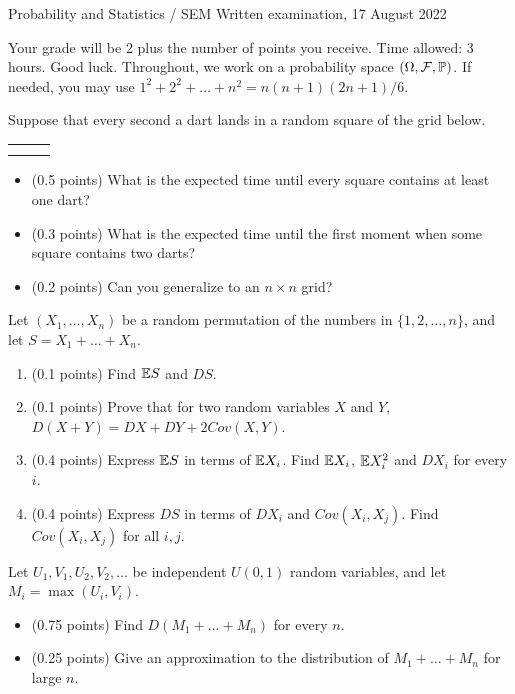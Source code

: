\documentclass[a4paper]{report}
\begin{document}
\noindent Probability and Statistics / SEM \hfill Written examination, 17 August 2022
\hrulefill
\begin{it}
Your grade will be 2 plus the number of points you receive. Time allowed: 3 hours. Good luck.
Throughout, we work on a probability space $(\Omega,{\mathcal{F}},\mathbb P)$.
If needed, you may use $1^2+2^2+\dots+n^2=n(n+1)(2n+1)/6$.
\end{it}
\begin{problem}
Suppose that every second a dart lands in a random square of the grid below.
\begingroup
\begin{center}
\setlength{\tabcolsep}{1pt}
\renewcommand{\arraystretch}{3}
\begin{tabular}{|*{3}{>{\collectcell\fwcell}c<{\endcollectcell}|}}
\hline & & \\ \hline & & \\ \hline & & \\ \hline
\end{tabular}
\end{center}
\endgroup
\begin{itemize}
\item (0.5 points) What is the expected time until every square contains at least one dart?
\item (0.3 points) What is the expected time until the first moment when some square contains two darts?
\item (0.2 points) Can you generalize to an $n\times n$ grid?
\end{itemize}
\end{problem}
\begin{problem}
Let $(X_1,\dots,X_n)$ be a random permutation of the numbers in $\{1,2,\dots,n\}$, and let $S=X_1+\dots+X_n$.
\begin{enumerate}
\item (0.1 points) Find $\mathbb {E} S$ and $D S$.
\item (0.1 points) Prove that for two random variables $X$ and $Y$, $D(X+Y)=DX+DY+2Cov(X,Y)$.
\item (0.4 points) Express $\mathbb {E} S$ in terms of $\mathbb {E} X_i$. Find $\mathbb {E} X_i$, $\mathbb {E} X_i^2$ and $D X_i$ for every $i$.
\item (0.4 points) Express $D S$ in terms of $D X_i$ and $Cov(X_i,X_j)$. Find $Cov(X_i,X_j)$ for all $i,j$.
\end{enumerate}
\end{problem}
\begin{problem}
Let $U_1,V_1,U_2,V_2,\dots$ be independent $U(0,1)$ random variables, and let $M_i=\max(U_i,V_i)$.
\begin{itemize}
\item (0.75 points) Find $D(M_1+\dots+M_n)$ for every $n$.
\item (0.25 points) Give an approximation to the distribution of $M_1+\dots+M_n$ for large $n$.
\end{itemize}
\end{problem}
\end{document}
